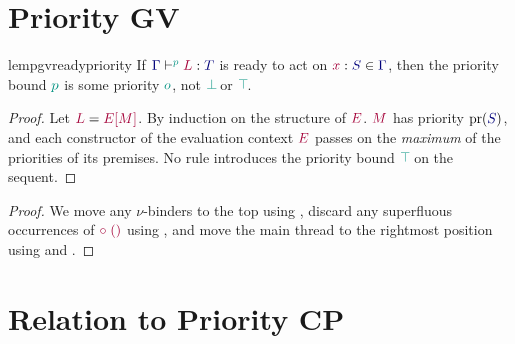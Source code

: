 \section{Priority GV}
\begingroup
{}















\begin{restatablelemma}{lempgvreadypriority}
  \label{lem:pgv-ready-priority}
  If $\tseq[\cs{p}]{\ty{\Gamma}}{L}{T}$ is ready to act on $\tmty{x}{S}\in\ty{\Gamma}$, then the priority bound $\cs{p}$ is some priority $\cs{o}$, \ie not $\cs{\pbot}$ or $\cs{\ptop}$.
\end{restatablelemma}
\begin{proof}
  Let $\tm{L}=\tm{\plug{E}{M}}$. By induction on the structure of $\tm{E}$. $\tm{M}$ has priority $\pr({\ty{S}})$, and each constructor of the evaluation context $\tm{E}$ passes on the \emph{maximum} of the priorities of its premises. No rule introduces the priority bound $\cs{\ptop}$ on the sequent.
\end{proof}

\begin{proof}
  We move any $\nu$-binders to the top using , discard any superfluous occurrences of $\tm{\child\;\unit}$ using , and move the main thread to the rightmost position using  and .
\end{proof}


\endgroup

\section{Relation to Priority CP}
\begingroup
{}
